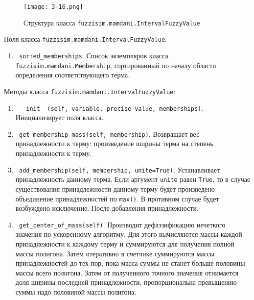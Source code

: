 \begin{figure}[ht]
	\centering
	\texttt{[image: 3-16.png]}
	\caption{ Структура класса \lstinline!fuzzisim.mamdani.IntervalFuzzyValue!}
\end{figure}

Поля класса \lstinline!fuzzisim.mamdani.IntervalFuzzyValue!:
\begin{enumerate}[label=\arabic*)]
	\item \lstinline! sorted_memberships!. Список экземпляров класса   \lstinline!fuzzisim.mamdani.Membership!, сортированный по началу области определения соответствующего терма.
\end{enumerate}


Методы класса \lstinline!fuzzisim.mamdani.IntervalFuzzyValue!:
\begin{enumerate}[label=\arabic*)]
	\item \lstinline! __init__(self, variable, precise_value, memberships)!. Инициализирует поля класса.
	\item \lstinline! get_membership_mass(self, membership)!. Возвращает вес принадлежности к терму: произведение ширины терма на степень принадлежности к терму.
	\item \lstinline! add_membership(self, membership, unite=True)!. Устанавливает принадлежность данному терма. Если аргумент \lstinline!unite! равен \lstinline!True!, то в случае существования принадлежности данному терму будет произведено объединение принадлежностей по \lstinline!max()!. В противном случае будет возбуждено исключение. После добавления принадлежности.
	\item \lstinline! get_center_of_mass(self)!. Производит дефаззификацию нечеткого значения по ускоренному алгоритму. Для этого вычисляются массы каждой принадлежности к каждому терму и суммируются для получения полной массы полигона. Затем итеративно в счетчике суммируются массы принадлежностей до тех пор, пока масса суммы не станет больше половины массы всего полигона. Затем от полученного точного значения отнимается доля ширины последней принадлежности, пропорциональна превышению суммы надо половиной массы полигона.
\end{enumerate}


